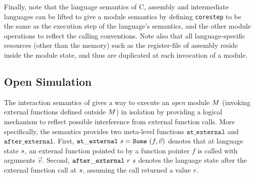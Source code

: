 
Finally, note that the language semantics of C, assembly and
intermediate languages can be lifted to give a module semantics by
defining \texttt{corestep} to be the same as the execution step of the
language's semantics, and the other module operations to reflect the
calling conventions. Note also that all language-specific resources
(\ie other than the memory)
such as the register-file of assembly 
reside inside the module state, and thus are
duplicated at each invocation of a module.



\subsection{Open Simulation}
The interaction semantics of \ccc{} gives a way to execute an
\emph{open} module $M$ (\ie invoking external functions defined
outside $M$) in isolation by providing a logical mechanism to
reflect possible interference from external function calls. More
specifically, the semantics provides two meta-level functions
$\mathtt{at\_external}$ and $\mathtt{after\_external}$. First,
$\mathtt{at\_external}~s = \mathtt{Some}~(f,\vec{v})$ denotes that
at language state $s$, an external function pointed to by a
function pointer $f$ is called with arguments $\vec{v}$. Second,
$\mathtt{after\_external}~r~s$ denotes the language state after the
external function call at $s$, assuming the call returned a value
$r$.


